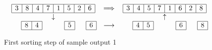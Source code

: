 \begin{figure}[h]
\begin{align*}
\begin{array}{ccc}
\begin{array}{|c|c|c|c|c|c|c|c|c|}
\hline
3 & 8 & 4 & 7 & 1 & 5 & 2 & 6 \\
\hline
\end{array}
& \Longrightarrow&
\begin{array}{|c|c|c|c|c|c|c|c|c|}
\hline
3 & 4 & 5 & 7 & 1 & 6 & 2 & 8 \\
\hline
\end{array} \\
\downarrow & \phantom\sum & \uparrow \\
\hspace{0.5625cm}
\begin{array}{|c|c|}
\hline
8  & 4 \\
\hline
\end{array} 
\hspace{1.125cm}
\begin{array}{|c|}
\hline 5 \\ \hline
\end{array} 
\hspace{0.5625cm}
\begin{array}{|c|}
\hline 6 \\ \hline
\end{array} 
& \longrightarrow &
\hspace{0.5625cm}
\begin{array}{|c|c|}
\hline
4  & 5 \\
\hline
\end{array} 
\hspace{1.125cm}
\begin{array}{|c|}
\hline 6 \\ \hline
\end{array} 
\hspace{0.5625cm}
\begin{array}{|c|}
\hline 8 \\ \hline
\end{array} 
\end{array}
\end{align*}
\caption{First sorting step of sample output 1}
\end{figure}
\vspace{-1.0cm}


